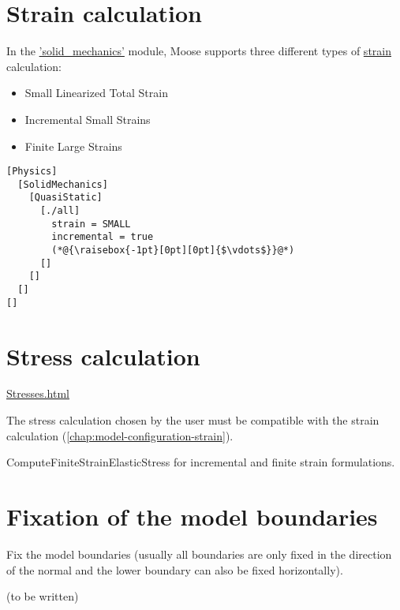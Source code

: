 \section{Strain calculation}
\label{chap:model-configuration-strain}

In the
\href{https://mooseframework.inl.gov/modules/solid_mechanics/}{'solid\_mechanics'}
module, Moose supports three different types of
\href{https://mooseframework.inl.gov/modules/solid_mechanics/Strains.html}{strain}
calculation:
\begin{itemize}
    \item {Small Linearized Total Strain}
    \item {Incremental Small Strains}
    \item {Finite Large Strains}
\end{itemize}

\begin{lstlisting}[language=Moose, caption={Setting up incremental small strains within the Physics/SolidMechanics block},label={setup-incremental-small-strains}]
[Physics]
  [SolidMechanics]
    [QuasiStatic]
      [./all]
        strain = SMALL
        incremental = true
        (*@{\raisebox{-1pt}[0pt][0pt]{$\vdots$}}@*)
      []
    []
  []
[]
\end{lstlisting}

\section{Stress calculation}
\label{chap:model-configuration-stress}

\href{https://mooseframework.inl.gov/modules/solid_mechanics/Stresses.html}{Stresses.html}

The stress calculation chosen by the user must be compatible with the strain
calculation (\autoref{chap:model-configuration-strain}).

ComputeFiniteStrainElasticStress for incremental and finite strain
formulations.

\section{Fixation of the model boundaries}
\label{chap:model-configuration-boundary-fixities}

Fix the model boundaries (usually all boundaries are only fixed in the
direction of the normal and the lower boundary can also be fixed horizontally).

(to be written)